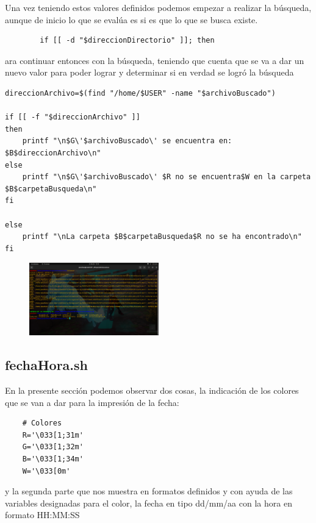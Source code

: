 \documentclass[letterpaper,12pt]{article} %
\begin{document}
Una vez teniendo estos valores definidos podemos empezar a realizar la búsqueda, aunque de inicio lo que se evalúa es si es que lo que se busca existe.

\begin{verbatim}
        if [[ -d "$direccionDirectorio" ]]; then
\end{verbatim}

ara continuar entonces con la búsqueda, teniendo que cuenta que se va a dar un nuevo valor para poder lograr y determinar si en verdad se logró la búsqueda

\begin{verbatim}
direccionArchivo=$(find "/home/$USER" -name "$archivoBuscado")

if [[ -f "$direccionArchivo" ]]
then
    printf "\n$G\'$archivoBuscado\' se encuentra en: $B$direccionArchivo\n"
else
    printf "\n$G\'$archivoBuscado\' $R no se encuentra$W en la carpeta $B$carpetaBusqueda\n"
fi
    
else
    printf "\nLa carpeta $B$carpetaBusqueda$R no se ha encontrado\n"
fi
\end{verbatim}

\begin{figure}[H]
    \centering
    \includegraphics[width=0.5\textwidth]{figurasShell/Buscar2.png}
\end{figure}

\subsection{fechaHora.sh}

En la presente sección podemos observar dos cosas, la indicación de los colores que se van a dar para la impresión de la fecha:

\begin{verbatim}
    # Colores
    R='\033[1;31m'
    G='\033[1;32m'
    B='\033[1;34m'
    W='\033[0m'
\end{verbatim}

y la segunda parte que nos muestra en formatos definidos y con ayuda de las variables designadas para el color, la fecha en tipo dd/mm/aa con la hora en formato HH:MM:SS
\end{document}
